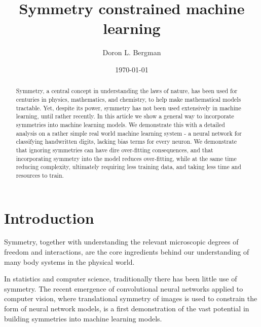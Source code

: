 \documentclass[twocolumn, prl]{revtex4-1}
\begin{document}
\newcommand{\be}{\begin{equation}}
\newcommand{\ee}{\end{equation}}


\title{Symmetry constrained machine learning}
\date{\today}

\author{Doron L. Bergman}

\begin{abstract}
Symmetry, a central concept in understanding the laws of nature, has been used for centuries in physics, mathematics, and chemistry, to help make mathematical models tractable. Yet, despite its power, symmetry has not been used extensively in machine learning, until rather recently. In this article we show a general way to incorporate symmetries into machine learning models. We demonstrate this with a detailed analysis on a rather simple real world machine learning system - a neural network for classifying handwritten digits, lacking bias terms for every neuron. We demonstrate that ignoring symmetries can have dire over-fitting consequences, and that incorporating symmetry into the model reduces over-fitting, while at the same time reducing complexity, ultimately requiring less training data, and taking less time and resources to train.
\end{abstract}

\maketitle


\section{Introduction}
\label{Sec:Intro}


Symmetry, together with understanding the relevant microscopic degrees of freedom and interactions, are the core ingredients behind our understanding of many body systems in the physical world.


In statistics and computer science, traditionally there has been little use of symmetry. The recent emergence of convolutional neural networks applied to computer vision\cite{lecun1999object, lecun1990handwritten, lecun1998gradient, krizhevsky2012imagenet, lee2009convolutional, lecun2015deep}, where translational symmetry of images is used to constrain the form of neural network models, is a first demonstration of the vast potential in building symmetries into machine learning models.
\end{document}
